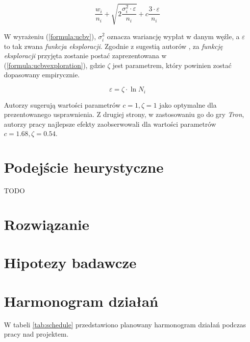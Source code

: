 \documentclass[a4paper,12pt]{article}
\let\oldsection\section
\renewcommand\section{\clearpage\oldsection}
\begin{document}
\begin{equation}\label{formula:ucbv}
\frac{w_i}{n_i} + \sqrt{2\frac{\sigma^2_i \cdot \varepsilon}{n_i}} + c \frac{3\cdot\varepsilon}{n_i}
\end{equation}

W wyrażeniu (\ref{formula:ucbv}), $\sigma^2_i$ oznacza wariancję wypłat w danym węźle, a $\varepsilon$ to tak zwana \textit{funkcja eksploracji}. Zgodnie z sugestią autorów \cite{ucbv}, za \textit{funkcję eksploracji} przyjęta zostanie postać zaprezentowana w (\ref{formula:ucbvexploration}), gdzie $\zeta$ jest parametrem, który powinien zostać dopasowany empirycznie.

\begin{equation}\label{formula:ucbvexploration}
\varepsilon = \zeta\cdot\ln N_i
\end{equation}

Autorzy \cite{ucbv} sugerują wartości parametrów $c=1, \zeta=1$ jako optymalne dla prezentowanego usprawnienia. Z drugiej strony, w zastosowaniu go do gry \textit{Tron}, autorzy pracy \cite{tron} najlepsze efekty zaobserwowali dla wartości parametrów $c=1.68, \zeta = 0.54$.



\section{Podejście heurystyczne}
TODO



\section{Rozwiązanie}


\section{Hipotezy badawcze}



\section{Harmonogram działań}
W tabeli \ref{tab:schedule} przedstawiono planowany harmonogram działań podczas pracy nad projektem.
\end{document}
